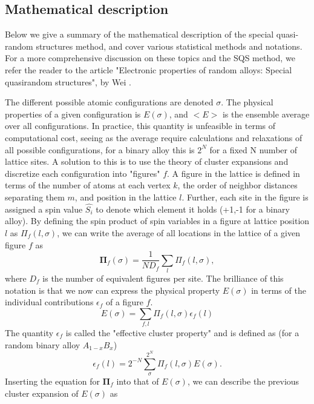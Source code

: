 \subsection{Mathematical description}

Below we give a summary of the mathematical description of the special quasi-random structures method, and cover various statistical methods and notations. For a more comprehensive discussion on these topics and the SQS method, we refer the reader to the article "Electronic properties of random alloys: Special quasirandom structures", by Wei \cite{sqsfull}.  

The different possible atomic configurations are denoted $\sigma$. The physical properties of a given configuration is $E(\sigma)$, and $<E>$ is the ensemble average over all configurations. In practice, this quantity is unfeasible in terms of computational cost, seeing as the average require calculations and relaxations of all possible configurations, for a binary alloy this is $2^N$ for a fixed N number of lattice sites. A solution to this is to use the theory of cluster expansions and discretize each configuration into "figures" $f$. A figure in the lattice is defined in terms of the number of atoms at each vertex $k$, the order of neighbor distances separating them $m$, and position in the lattice $l$. Further, each site in the figure is assigned a spin value $\hat{S_i}$ to denote which element it holds (+1,-1 for a binary alloy). By defining the spin product of spin variables in a figure at lattice position $l$ as $\Pi_f(l, \sigma)$, we can write the average of all locations in the lattice of a given figure $f$ as
\begin{equation}
    \boldsymbol{\Pi}_f(\sigma) = \frac{1}{ND_f} \sum_l \Pi_f (l,\sigma),
\end{equation}
where $D_f$ is the number of equivalent figures per site. The brilliance of this notation is that we now can express the physical property $E(\sigma)$ in terms of the individual contributions $\epsilon_f$ of a figure $f$.
\begin{equation}
    E(\sigma) = \sum_{f,l} \Pi_f(l, \sigma) \epsilon_f(l)
\end{equation}
The quantity $\epsilon_f$ is called the "effective cluster property" and is defined as (for a random binary alloy $A_{1-x}B_x$)
\begin{equation}
    \epsilon_f(l) = 2^{-N}\sum_\sigma^{2^N} \Pi_f (l,\sigma) E(\sigma).
\end{equation}
Inserting the equation for $\boldsymbol{\Pi}_f$ into that of $E(\sigma)$, we can describe the previous cluster expansion of $E(\sigma)$ as
